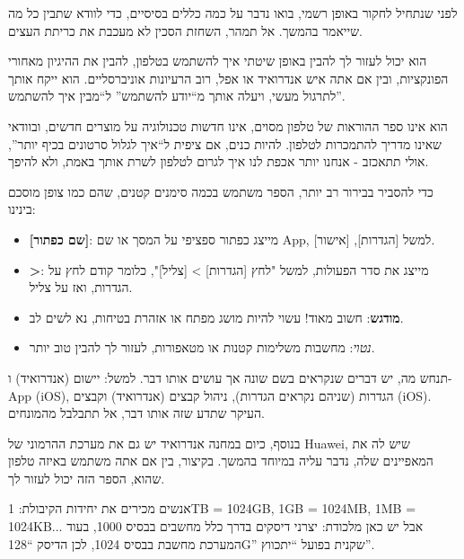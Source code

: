 
לפני שנתחיל לחקור באופן רשמי, בואו נדבר על כמה כללים בסיסיים, כדי לוודא שתבין כל מה שייאמר בהמשך. אל תמהר, השחזת הסכין לא מעכבת את כריתת העצים.


הוא יכול לעזור לך להבין באופן שיטתי איך להשתמש בטלפון, להבין את ההיגיון מאחורי הפונקציות, ובין אם אתה איש אנדרואיד או אפל, רוב הרעיונות אוניברסליים. הוא ייקח אותך לתרגול מעשי, ויעלה אותך מ“יודע להשתמש” ל“מבין איך להשתמש”.

הוא אינו ספר ההוראות של טלפון מסוים, אינו חדשות טכנולוגיה על מוצרים חדשים, ובוודאי שאינו מדריך להתמכרות לטלפון. להיות כנים, אם ציפית ל“איך לגלול סרטונים בכיף יותר”, אולי תתאכזב - אנחנו יותר אכפת לנו איך לגרום לטלפון לשרת אותך באמת, ולא להיפך.


כדי להסביר בבירור רב יותר, הספר משתמש בכמה סימנים קטנים, שהם כמו צופן מוסכם בינינו:

\begin{itemize}
  \item \textbf{[שם כפתור]}: מייצג כפתור ספציפי על המסך או שם App, למשל [הגדרות], [אישור].
  \item \textbf{>}: מייצג את סדר הפעולות, למשל "לחץ [הגדרות] > [צליל]", כלומר קודם לחץ על הגדרות, ואז על צליל.
  \item \textbf{מודגש}: חשוב מאוד! עשוי להיות מושג מפתח או אזהרת בטיחות, נא לשים לב.
  \item \emph{נטוי}: מחשבות משלימות קטנות או מטאפורות, לעזור לך להבין טוב יותר.
\end{itemize}


תנחש מה, יש דברים שנקראים בשם שונה אך עושים אותו דבר. למשל: יישום (אנדרואיד) ו-App (iOS), הגדרות (שניהם נקראים הגדרות), ניהול קבצים (אנדרואיד) וקבצים (iOS). העיקר שתדע שזה אותו דבר, אל תתבלבל מהמונחים.

בנוסף, כיום במחנה אנדרואיד יש גם את מערכת ההרמוני של Huawei, שיש לה את המאפיינים שלה, נדבר עליה במיוחד בהמשך. בקיצור, בין אם אתה משתמש באיזה טלפון שהוא, הספר הזה יכול לעזור לך.


אנשים מכירים את יחידות הקיבולת: 1TB = 1024GB, 1GB = 1024MB, 1MB = 1024KB... אבל יש כאן מלכודת: יצרני דיסקים בדרך כלל מחשבים בבסיס 1000, בעוד המערכת מחשבת בבסיס 1024, לכן הדיסק “128G” שקנית בפועל “יתכווץ”.

